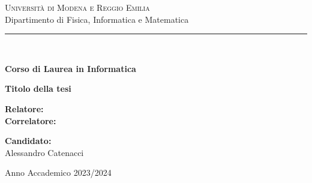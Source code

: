 
\begin{titlepage}
    \centering
    
    {\scshape\Large Università di Modena e Reggio Emilia\\[5mm]}
    {\Large Dipartimento di Fisica, Informatica e Matematica\\}
    \rule{145mm}{0.1mm}\\[6mm]
    
    \begin{spacing}{1.8}
        {\large\textbf{Corso di Laurea in Informatica}}
    \end{spacing}
    \vspace{30mm}
    
    \begin{spacing}{2.0}
        {\Large\bfseries Titolo della tesi}\\
    \end{spacing}
    
    \vspace{32mm}
    \large
    \noindent
    \begin{minipage}[t]{0.5\textwidth}
        \textbf{Relatore:}\\[10pt]
        \textbf{Correlatore:}
    \end{minipage}%
    \hfill%
    \begin{minipage}[t]{0.5\textwidth}\raggedleft
        \textbf{Candidato:}\\
        Alessandro Catenacci
    \end{minipage}
    
    \vfill
    
    {\large Anno Accademico 2023/2024}
    
\end{titlepage}
\restoregeometry

